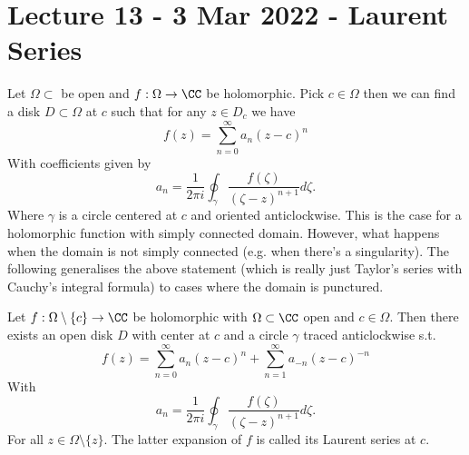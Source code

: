 \section{Lecture 13 - 3 Mar 2022 - Laurent Series}
Let $\Omega\subset$ be open and $f:\Omega\to\CC$ be holomorphic. Pick
$c\in\Omega$ then we can find a disk $D\subset\Omega$ at $c$ such that for any
$z\in D_c$ we have
\[f(z)=\sum_{n=0}^{\infty} a_n (z-c)^n\]
With coefficients given by
\[a_n=\frac{1}{2\pi i} \oint_{\gamma}\frac{f(\zeta)}{(\zeta-z)^{n+1}}d\zeta.\]
 Where $\gamma$ is a circle centered at $c$ and oriented anticlockwise. This is
 the case for a holomorphic function with simply connected domain. However, what
 happens when the domain is not simply connected (e.g. when there's a
 singularity). The following generalises the above statement (which is really
 just Taylor's series with Cauchy's integral formula) to cases where the domain is punctured.
 \begin{theorem}
   Let $f:\Omega\setminus\{c\}\to\CC$ be holomorphic with $\Omega\subset\CC$
   open and $c\in \Omega$. Then there exists an open disk $D$ with center at $c$
   and a circle $\gamma$ traced anticlockwise s.t.
   \[f(z)=\sum_{n=0}^{\infty} a_n(z-c)^n + \sum_{n=1}^{\infty} a_{-n}
   (z-c)^{-n}\]
   With 
   \[a_n=\frac{1}{2\pi i} \oint_{\gamma}\frac{f(\zeta)}{(\zeta-z)^{n+1}}d\zeta.\]
  For all $z\in\Omega\setminus\{z\}$. The latter expansion of $f$ is called its
  Laurent series at $c$.
   \label{thm:laurentSeries}
 \end{theorem}
